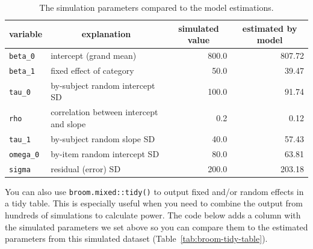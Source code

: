 \documentclass[
  english,
  doc,floatsintext]{apa6}
\newenvironment{Shaded}{\begin{snugshade}}{\end{snugshade}}
\newcommand{\CommentTok}[1]{\textcolor[rgb]{0.56,0.35,0.01}{\textit{#1}}}
\newcommand{\DataTypeTok}[1]{\textcolor[rgb]{0.13,0.29,0.53}{#1}}
\newcommand{\DecValTok}[1]{\textcolor[rgb]{0.00,0.00,0.81}{#1}}
\newcommand{\KeywordTok}[1]{\textcolor[rgb]{0.13,0.29,0.53}{\textbf{#1}}}
\newcommand{\NormalTok}[1]{#1}
\newcommand{\OperatorTok}[1]{\textcolor[rgb]{0.81,0.36,0.00}{\textbf{#1}}}
\newcommand{\StringTok}[1]{\textcolor[rgb]{0.31,0.60,0.02}{#1}}
\begin{document}
\begin{table}[H]

\begin{center}
\begin{threeparttable}

\caption{\label{tab:param-compare}The simulation parameters compared to the model estimations.}

\begin{tabular}{llrr}
\toprule
variable & \multicolumn{1}{c}{explanation} & \multicolumn{1}{c}{simulated value} & \multicolumn{1}{c}{estimated by model}\\
\midrule
\texttt{beta\_0} & intercept (grand mean) & 800.0 & 807.72\\
\texttt{beta\_1} & fixed effect of category & 50.0 & 39.47\\
\texttt{tau\_0} & by-subject random intercept SD & 100.0 & 91.74\\
\texttt{rho} & correlation between intercept and slope & 0.2 & 0.12\\
\texttt{tau\_1} & by-subject random slope SD & 40.0 & 57.43\\
\texttt{omega\_0} & by-item random intercept SD & 80.0 & 63.81\\
\texttt{sigma} & residual (error) SD & 200.0 & 203.18\\
\bottomrule
\end{tabular}

\end{threeparttable}
\end{center}

\end{table}

You can also use \texttt{broom.mixed::tidy()} to output fixed and/or random effects in a tidy table. This is especially useful when you need to combine the output from hundreds of simulations to calculate power. The code below adds a column with the simulated parameters we set above so you can compare them to the estimated parameters from this simulated dataset (Table~\ref{tab:broom-tidy-table}).

\begin{Shaded}
\end{Shaded}
\end{document}
